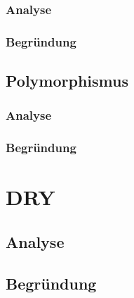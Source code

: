		\subsubsection{Analyse}

		\subsubsection{Begründung}

	\subsection{Polymorphismus}

		\subsubsection{Analyse}

		\subsubsection{Begründung}

\section{DRY}

	\subsection{Analyse}

	\subsection{Begründung}
